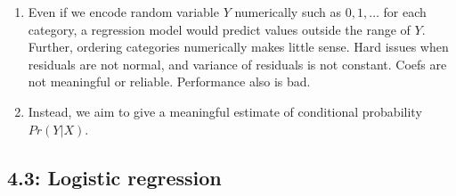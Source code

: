 \documentclass{article}
\begin{document}
\begin{enumerate}
\item Even if we encode random variable $Y$ numerically such as $0,1,\dots$ for each category, a regression model would predict values outside the range of $Y$. Further, ordering categories numerically makes little sense. Hard issues when residuals are not normal, and variance of residuals is not constant. Coefs are not meaningful or reliable. Performance also is bad.
\item Instead, we aim to give a meaningful estimate of conditional probability $Pr(Y | X)$.
\end{enumerate}

\subsection*{4.3: Logistic regression}
\end{document}
